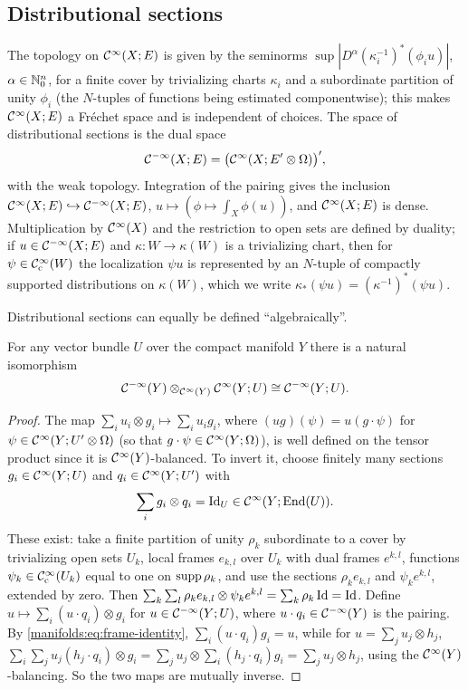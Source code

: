 \subsection{Distributional sections}
The topology on $\mathcal{C}^\infty(X;E)$ is given by the seminorms
$\sup|D^\alpha(\kappa_i^{-1})^*(\phi_iu)|$, $\alpha\in\mathbb{N}_0^n$, for a finite cover
by trivializing charts $\kappa_i$ and a subordinate partition of unity $\phi_i$
(the $N$-tuples of functions being estimated componentwise); this makes
$\mathcal{C}^\infty(X;E)$ a Fr\'echet space and is independent of choices. The space of
distributional sections is the dual space
\begin{equation}\label{manifolds:eq:distributions}
\mathcal{C}^{-\infty}(X;E)=\big(\mathcal{C}^\infty(X;E'\otimes\Omega)\big)',
\end{equation}
with the weak topology. Integration of the pairing gives the inclusion
$\mathcal{C}^\infty(X;E)\hookrightarrow\mathcal{C}^{-\infty}(X;E)$, $u\mapsto(\phi\mapsto\int_X\phi(u))$, and
$\mathcal{C}^\infty(X;E)$ is dense. Multiplication by $\mathcal{C}^\infty(X)$ and the restriction to open sets
are defined by duality; if $u\in\mathcal{C}^{-\infty}(X;E)$ and $\kappa:W\to\kappa(W)$ is a
trivializing chart, then for $\psi\in\mathcal{C}^\infty_{\mathrm{c}}(W)$ the localization $\psi u$ is
represented by an $N$-tuple of compactly supported distributions on $\kappa(W)$,
which we write $\kappa_*(\psi u)=(\kappa^{-1})^*(\psi u)$.

Distributional sections can equally be defined ``algebraically''.

\begin{proposition}\label{manifolds:prop:tensor}
For any vector bundle $U$ over the compact manifold $Y$ there is a natural
isomorphism
\begin{equation*}
\mathcal{C}^{-\infty}(Y)\otimes_{\mathcal{C}^\infty(Y)}\mathcal{C}^\infty(Y;U)\cong\mathcal{C}^{-\infty}(Y;U).
\end{equation*}
\end{proposition}
\begin{proof}
The map $\sum_iu_i\otimes g_i\mapsto\sum_i u_ig_i$, where
$(u g)(\psi)=u(g\cdot\psi)$ for $\psi\in\mathcal{C}^\infty(Y;U'\otimes\Omega)$ (so that
$g\cdot\psi\in\mathcal{C}^\infty(Y;\Omega)$), is well defined on the tensor product since it is
$\mathcal{C}^\infty(Y)$-balanced. To invert it, choose finitely many sections $g_i\in\mathcal{C}^\infty(Y;U)$
and $q_i\in\mathcal{C}^\infty(Y;U')$ with
\begin{equation}\label{manifolds:eq:frame-identity}
\sum_i g_i\otimes q_i=\operatorname{Id}_U\in\mathcal{C}^\infty(Y;\operatorname{End}(U)).
\end{equation}
These exist: take a finite partition of unity $\rho_k$ subordinate to a cover by
trivializing open sets $U_k$, local frames $e_{k,l}$ over $U_k$ with dual frames
$e^{k,l}$, functions $\psi_k\in\mathcal{C}^\infty_{\mathrm{c}}(U_k)$ equal to one on $\operatorname{supp}\rho_k$, and use
the sections $\rho_ke_{k,l}$ and $\psi_ke^{k,l}$, extended by zero. Then
$\sum_k\sum_l\rho_ke_{k,l}\otimes\psi_ke^{k,l}=\sum_k\rho_k\operatorname{Id}=\operatorname{Id}$. Define
$u\mapsto\sum_i(u\cdot q_i)\otimes g_i$ for $u\in\mathcal{C}^{-\infty}(Y;U)$, where $u\cdot q_i\in\mathcal{C}^{-\infty}(Y)$
is the pairing. By \eqref{manifolds:eq:frame-identity},
$\sum_i(u\cdot q_i)g_i=u$, while for $u=\sum_ju_j\otimes h_j$,
$\sum_i\sum_ju_j(h_j\cdot q_i)\otimes g_i=\sum_ju_j\otimes\sum_i(h_j\cdot q_i)g_i
=\sum_ju_j\otimes h_j$, using the $\mathcal{C}^\infty(Y)$-balancing. So the two maps are
mutually inverse.
\end{proof}

